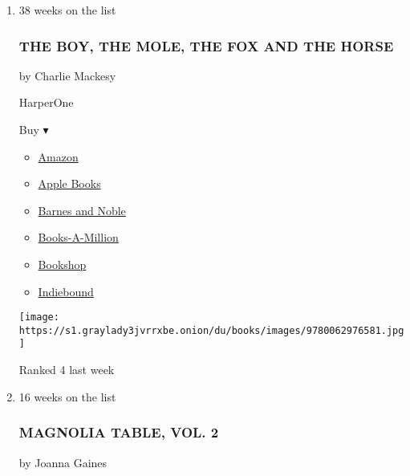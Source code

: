 \begin{enumerate}
\def\labelenumi{\arabic{enumi}.}
\item
  38 weeks on the list

  \hypertarget{the-boy-the-mole-the-fox-and-the-horse}{%
  \subsubsection{THE BOY, THE MOLE, THE FOX AND THE
  HORSE}\label{the-boy-the-mole-the-fox-and-the-horse}}

  by Charlie Mackesy

  HarperOne

  Buy ▾

  \begin{itemize}
  \tightlist
  \item
    \href{https://www.amazon.com/Boy-Mole-Fox-Horse/dp/0062976583?tag=NYTBS-20}{Amazon}
  \item
    \href{https://du-gae-books-dot-nyt-du-prd.appspot.com/buy?title=THE+BOY\%2C+THE+MOLE\%2C+THE+FOX+AND+THE+HORSE\&author=Charlie+Mackesy}{Apple
    Books}
  \item
    \href{https://www.anrdoezrs.net/click-7990613-11819508?url=https\%3A\%2F\%2Fwww.barnesandnoble.com\%2Fw\%2F\%3Fean\%3D9780062976581}{Barnes
    and Noble}
  \item
    \href{https://www.anrdoezrs.net/click-7990613-35140?url=https\%3A\%2F\%2Fwww.booksamillion.com\%2Fp\%2FTHE\%2BBOY\%252C\%2BTHE\%2BMOLE\%252C\%2BTHE\%2BFOX\%2BAND\%2BTHE\%2BHORSE\%2FCharlie\%2BMackesy\%2F9780062976581}{Books-A-Million}
  \item
    \href{https://bookshop.org/a/3546/9780062976581}{Bookshop}
  \item
    \href{https://www.indiebound.org/book/9780062976581?aff=NYT}{Indiebound}
  \end{itemize}

  \texttt{[image: https://s1.graylady3jvrrxbe.onion/du/books/images/9780062976581.jpg]}

  Ranked 4 last week
\item
  16 weeks on the list

  \hypertarget{magnolia-table-vol-2}{%
  \subsubsection{MAGNOLIA TABLE, VOL. 2}\label{magnolia-table-vol-2}}

  by Joanna Gaines


\end{enumerate}
